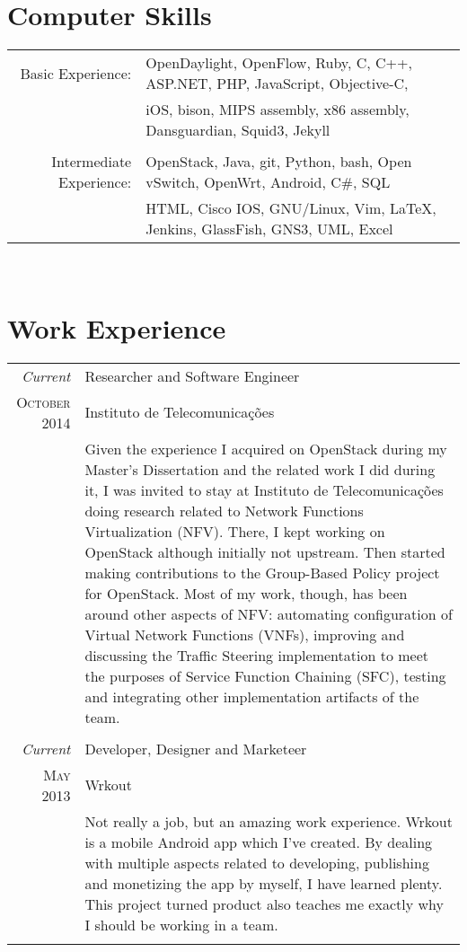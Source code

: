\documentclass[letter,10pt]{article} %
\begin{document}

\section{Computer Skills}

\begin{tabular}{rl}
Basic Experience:
& OpenDaylight, OpenFlow, Ruby, C, C++, ASP.NET, PHP, JavaScript, Objective-C, \\
& iOS, bison, MIPS assembly, x86 assembly, Dansguardian, Squid3, Jekyll\\
& \\
Intermediate Experience:
& OpenStack, Java, git, Python, bash, Open vSwitch, OpenWrt, Android, C\#, SQL\\
& HTML, Cisco IOS, GNU/Linux, Vim, {\LaTeX}, Jenkins, GlassFish, GNS3, UML, Excel\\
\end{tabular} \\


\section{Work Experience}

\begin{tabular}{r|p{11cm}}
	\emph{Current} & Researcher and Software Engineer \\
    \textsc{October 2014} & Instituto de Telecomunicações \\
    & \footnotesize{Given the experience I acquired on OpenStack during my Master's Dissertation and the related work I did during it, I was invited to stay at Instituto de Telecomunicações doing research related to Network Functions Virtualization (NFV). There, I kept working on OpenStack although initially not upstream. Then started making contributions to the Group-Based Policy project for OpenStack. Most of my work, though, has been around other aspects of NFV: automating configuration of Virtual Network Functions (VNFs), improving and discussing the Traffic Steering implementation to meet the purposes of Service Function Chaining (SFC), testing and integrating other implementation artifacts of the team. }\\
	\multicolumn{2}{c}{} \\
	
	\emph{Current} & Developer, Designer and Marketeer \\
	\textsc{May 2013} & Wrkout \\ 
	& \footnotesize{Not really a job, but an amazing work experience. Wrkout is a mobile Android app which I've created. By dealing with multiple aspects related to developing, publishing and monetizing the app by myself, I have learned plenty. This project turned product also teaches me exactly why I should be working in a team.}\\
	\multicolumn{2}{c}{}\\
\end{tabular}
\end{document}
